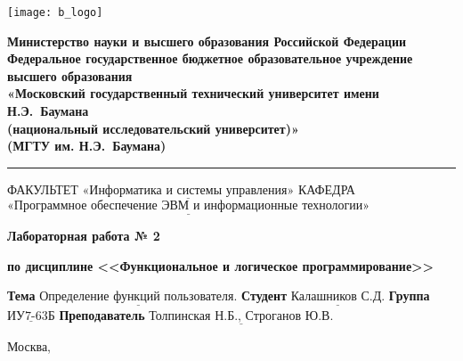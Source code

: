 \thispagestyle{empty}

\noindent \begin{minipage}{0.15\textwidth}
	\texttt{[image: b\_logo]}
\end{minipage}
\noindent\begin{minipage}{0.8\textwidth}\centering
	\textbf{Министерство науки и высшего образования Российской Федерации}\\
	\textbf{Федеральное государственное бюджетное образовательное учреждение высшего образования}\\
	\textbf{«Московский государственный технический университет имени Н.Э.~Баумана}\\
	\textbf{(национальный исследовательский университет)»}\\
	\textbf{(МГТУ им. Н.Э.~Баумана)}
\end{minipage}

\noindent\rule{18cm}{3pt}
\newline\newline
\noindent ФАКУЛЬТЕТ $\underline{\text{«Информатика и системы управления»}}$ \newline\newline
\noindent КАФЕДРА $\underline{\text{«Программное обеспечение ЭВМ и информационные технологии»}}$\newline\newline\newline


\begin{center}
	\noindent\begin{minipage}{1\textwidth}\centering
		\Large\textbf{  Лабораторная работа № 2}
		
		\textbf{по дисциплине <<Функциональное и логическое программирование>>}
		
		\textbf{}
		
		\textbf{}
	\end{minipage}
\end{center}

\noindent\textbf{Тема} $\underline{\text{Определение функций пользователя.}}$\newline\newline
\noindent\textbf{Студент} $\underline{\text{Калашников С.Д.}}$\newline\newline
\noindent\textbf{Группа} $\underline{\text{ИУ7-63Б}}$\newline\newline
\noindent\textbf{Преподаватель} $\underline{\text{Толпинская Н.Б., Строганов Ю.В.}}$\newline

\begin{center}
	\vfill
	Москва,~\the\year
\end{center}
\clearpage
